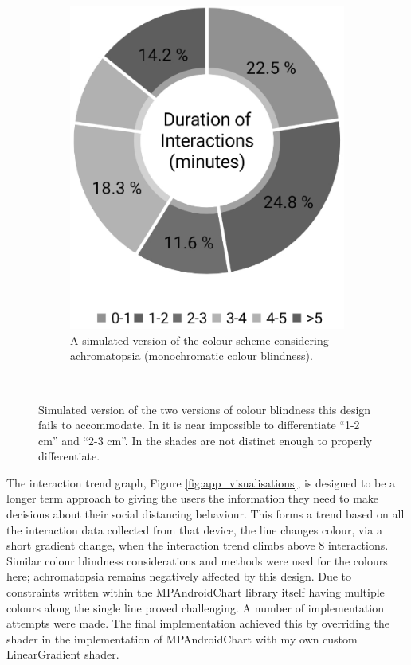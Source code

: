 \documentclass{l4proj}
\begin{document}
\begin{figure}[!htb]
\begin{subfigure}[b]{0.3\textwidth}
        \includegraphics[width=\textwidth]{images/achromatopsia.png}
        \caption{ A simulated version of the colour scheme considering achromatopsia (monochromatic colour blindness). }
        \label{fig:achromatopsia}
    \end{subfigure}
    ~
    \caption{ Simulated version of the two versions of colour blindness this design fails to accommodate. In  it is near impossible to differentiate “1-2 cm” and “2-3 cm”. In  the shades are not distinct enough to properly differentiate. }
    \label{fig:colour_blindess}
\end{figure}

The interaction trend graph, Figure \ref{fig:app_visualisations}, is designed to be a longer term approach to giving the users the information they need to make decisions about their social distancing behaviour. This forms a trend based on all the interaction data collected from that device, the line changes colour, via a short gradient change, when the interaction trend climbs above 8 interactions. Similar colour blindness considerations and methods were used for the colours here; achromatopsia remains negatively affected by this design. Due to constraints written within the MPAndroidChart library itself having multiple colours along the single line proved challenging. A number of implementation attempts were made. The final implementation achieved this by overriding the shader in the implementation of MPAndroidChart with my own custom LinearGradient shader.
\end{document}
